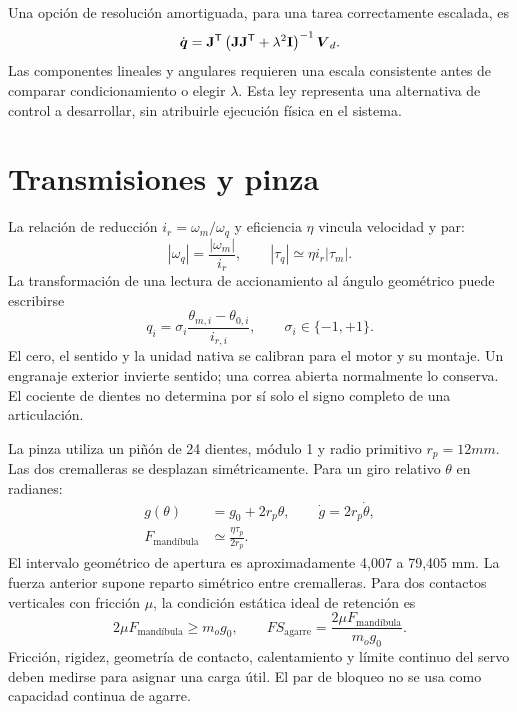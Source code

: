 Una opción de resolución amortiguada, para una tarea correctamente escalada, es
\begin{equation}
\dot{\boldsymbol{q}}=\mathbf{J}^{\mathsf{T}}
\left(\mathbf{J}\mathbf{J}^{\mathsf{T}}+\lambda^2\mathbf{I}\right)^{-1}\boldsymbol{V}_d.
\end{equation}
Las componentes lineales y angulares requieren una escala consistente antes de comparar condicionamiento o elegir $\lambda$. Esta ley representa una alternativa de control a desarrollar, sin atribuirle ejecución física en el sistema.

\section{Transmisiones y pinza}
La relación de reducción $i_r=\omega_m/\omega_q$ y eficiencia $\eta$ vincula velocidad y par:
\begin{equation}
|\omega_q|=\frac{|\omega_m|}{i_r},\qquad
|\tau_q|\simeq\eta i_r|\tau_m|.
\end{equation}
La transformación de una lectura de accionamiento al ángulo geométrico puede escribirse
\begin{equation}
q_i=\sigma_i\frac{\theta_{m,i}-\theta_{0,i}}{i_{r,i}},\qquad \sigma_i\in\{-1,+1\}.
\end{equation}
El cero, el sentido y la unidad nativa se calibran para el motor y su montaje. Un engranaje exterior invierte sentido; una correa abierta normalmente lo conserva. El cociente de dientes no determina por sí solo el signo completo de una articulación.

La pinza utiliza un piñón de 24 dientes, módulo 1 y radio primitivo $r_p=12\unit{mm}$. Las dos cremalleras se desplazan simétricamente. Para un giro relativo $\theta$ en radianes:
\begin{align}
g(\theta)&=g_0+2r_p\theta,\qquad \dot g=2r_p\dot\theta,\\
F_{\mathrm{mandíbula}}&\simeq\frac{\eta\tau_p}{2r_p}.
\end{align}
El intervalo geométrico de apertura es aproximadamente 4,007 a 79,405 mm. La fuerza anterior supone reparto simétrico entre cremalleras. Para dos contactos verticales con fricción $\mu$, la condición estática ideal de retención es
\begin{equation}
2\mu F_{\mathrm{mandíbula}}\ge m_o g_0,
\qquad FS_{\mathrm{agarre}}=\frac{2\mu F_{\mathrm{mandíbula}}}{m_og_0}.
\end{equation}
Fricción, rigidez, geometría de contacto, calentamiento y límite continuo del servo deben medirse para asignar una carga útil. El par de bloqueo no se usa como capacidad continua de agarre.
\FloatBarrier
